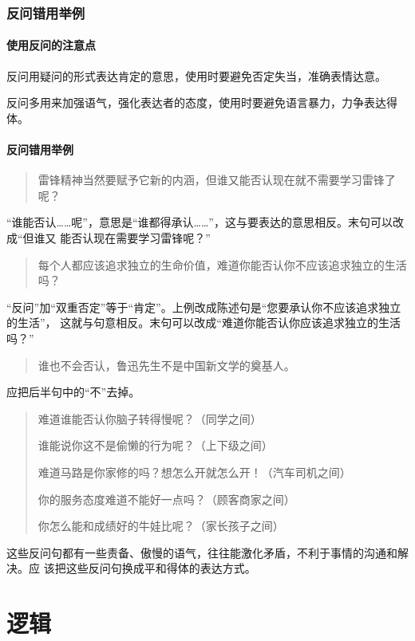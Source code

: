 \documentclass[final,oneside]{ctexbook}
\newenvironment{equotation}{\begin{quotation}\kaishu}{\end{quotation}}
\begin{document}
\subsection{反问错用举例}

\subsubsection{使用反问的注意点}

反问用疑问的形式表达肯定的意思，使用时要避免否定失当，准确表情达意。

反问多用来加强语气，强化表达者的态度，使用时要避免语言暴力，力争表达得体。

\subsubsection{反问错用举例}

\begin{equotation}
  雷锋精神当然要赋予它新的内涵，但谁又能否认现在就不需要学习雷锋了呢？
\end{equotation}
“谁能否认……呢”，意思是“谁都得承认……”，这与要表达的意思相反。末句可以改成“但谁又
能否认现在需要学习雷锋呢？”

\begin{equotation}
  每个人都应该追求独立的生命价值，难道你能否认你不应该追求独立的生活吗？
\end{equotation}
“反问”加“双重否定”等于“肯定”。上例改成陈述句是“您要承认你不应该追求独立的生活”，
这就与句意相反。末句可以改成“难道你能否认你应该追求独立的生活吗？”

\begin{equotation}
  谁也不会否认，鲁迅先生不是中国新文学的奠基人。
\end{equotation}
应把后半句中的“不”去掉。

\begin{equotation}
  难道谁能否认你脑子转得慢呢？（同学之间）

  谁能说你这不是偷懒的行为呢？（上下级之间）

  难道马路是你家修的吗？想怎么开就怎么开！（汽车司机之间）

  你的服务态度难道不能好一点吗？（顾客商家之间）

  你怎么能和成绩好的牛娃比呢？（家长孩子之间）
\end{equotation}
这些反问句都有一些责备、傲慢的语气，往往能激化矛盾，不利于事情的沟通和解决。应
该把这些反问句换成平和得体的表达方式。

\chapter{逻辑}
\end{document}
